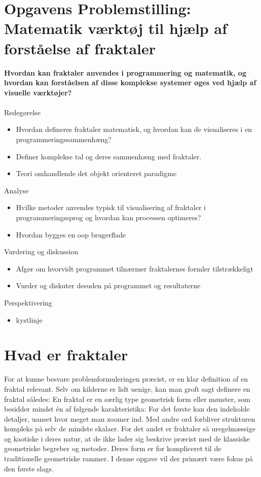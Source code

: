 \documentclass{article}
\begin{document}
\section*{Opgavens Problemstilling: Matematik værktøj til hjælp af forståelse af fraktaler}
\textbf{Hvordan kan fraktaler anvendes i programmering og matematik, og hvordan kan forståelsen af disse komplekse systemer øges ved hjælp af visuelle værktøjer?}\\\\
Redegørelse
\begin{itemize}
    \item Hvordan defineres fraktaler matematisk, og hvordan kan de visualiseres i en programmeringssammenhæng?
    \item Definer komplekse tal og deres sammenhæng med fraktaler.
    \item Teori omhandlende det objekt orienteret paradigme
\end{itemize}
Analyse
\begin{itemize}
    \item Hvilke metoder anvendes typisk til visualisering af fraktaler i programmeringssprog og hvordan kan processen optimeres?
    \item Hvordan bygges en oop brugerflade
\end{itemize}
Vurdering og diskussion
\begin{itemize}
    \item Afgør om hvorvidt programmet tilnærmer fraktalernes formler tilstrækkeligt
    \item Vurder og diskuter desuden på programmet og resultaterne
\end{itemize}
Perspektivering
\begin{itemize}
    \item kystlinje
\end{itemize}

\newpage
\tableofcontents
\newpage

\section{Hvad er fraktaler}
For at kunne besvare problemformuleringen præcist, er en klar definition af en fraktal relevant. Selv om kilderne er lidt uenige, kan man groft sagt definere en fraktal således: En fraktal er en særlig type geometrisk form eller mønster, som besidder mindst én af følgende karakteristika: For det første kan den indeholde detaljer, uanset hvor meget man zoomer ind. Med andre ord forbliver strukturen kompleks på selv de mindste skalaer. For det andet er fraktaler så uregelmæssige og kaotiske i deres natur, at de ikke lader sig beskrive præcist med de klassiske geometriske begreber og metoder. Deres form er for kompliceret til de traditionelle geometriske rammer. I denne opgave vil der primært være fokus på den første slags.\parencite{vestergaard}\\
\end{document}
